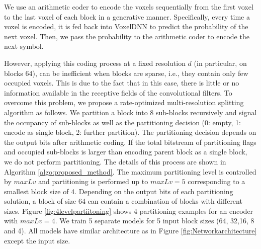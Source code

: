 We use an arithmetic coder to encode the voxels sequentially from the first voxel to the last voxel of each block in a generative manner. Specifically, every time a voxel is encoded, it is fed back into VoxelDNN to predict the probability of the next voxel. Then, we pass the probability to the arithmetic coder to encode the next symbol. 

However, applying this coding process at a fixed resolution $d$ (in particular, on blocks 64), can be inefficient when blocks are sparse, i.e.,  they contain only few occupied voxels. 
This is due to the fact that in this case, there is little or no information available in the receptive fields of the convolutional filters. To overcome this problem, we propose a rate-optimized multi-resolution splitting algorithm as follows.
We partition a block into 8 sub-blocks recursively and signal the occupancy of sub-blocks as well as the partitioning decision (0: empty, 1: encode as single block, 2: further partition). The partitioning decision depends on the output bits after arithmetic coding. If the total bitstream of partitioning flags and occupied sub-blocks is larger than encoding parent block as a single block, we do not perform partitioning. The details of this  process are shown in Algorithm \ref{algo:proposed_method}. The maximum partitioning level is controlled by $maxLv$ and  partitioning is performed up to $maxLv=5$ corresponding to a smallest block size of 4. Depending on the output bits of each partitioning solution, a block of size 64 can contain a combination of blocks with different sizes. Figure \ref{fig:4levelpartiitoning} shows 4 partitioning examples for an encoder with $maxLv=4$. We train 5 separate models for 5 input block sizes (64, 32,16, 8 and 4). All models have similar architecture as in Figure \ref{fig:Networkarchitecture} except the input size.



